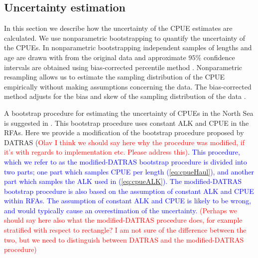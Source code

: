 \documentclass[a4paper 12pt]{article}
\numberwithin{equation}{section}
\newcommand{\ed}[1]{\textcolor{red}{#1}}
\newcommand{\nat}[1]{\textcolor{blue}{#1}}
\begin{document}
\subsection{Uncertainty estimation}
\label{sec:uncertaintyestimation}
In this section we describe how the uncertainty of the CPUE estimates are calculated. We use nonparametric bootstrapping to quantify the uncertainty of the CPUEs. In nonparametric bootstrapping independent samples of lengths and age are drawn with from the original data and approximate $95\%$ confidence intervals are obtained using bias-corrected percentile method  \citep{carpenter2000bootstrap}. Nonparametric resampling allows us to estimate the sampling distribution of the CPUE empirically without making assumptions concerning the data. The bias-corrected method adjusts for the bias and skew of the sampling distribution of the data \citep{puth2015variety, karlsson2009bootstrap}. 

A bootstrap procedure for estimating the uncertainty of CPUEs in the North Sea is suggested in \citet{ICES2006Report}. This bootstrap procedure uses constant ALK and CPUE in the RFAs. Here we provide a modification of the bootstrap procedure proposed by DATRAS (\ed{Olav I think we should say here why the procedure was modified, if it's with regards to implementation etc. Please address this)}. \nat{This procedure, which we refer to as the modified-DATRAS bootstrap procedure is divided into two parts; one part which samples CPUE per length (\ref{eq:cpueHaul}), and another part which samples the ALK used in (\ref{eq:cpueALK}). The modified-DATRAS bootstrap procedure is also based on the assumption of constant ALK and CPUE within RFAs. The assumption of constant ALK and CPUE is likely to be wrong, and would typically cause an overestimation of the uncertainty. \ed{(Perhaps we should say here also what the modified-DATRAS procedure does, for example stratified with respect to rectangle? I am not sure of the difference between the two, but we need to distinguish between DATRAS and the modified-DATRAS procedure)}} 

\end{document}
